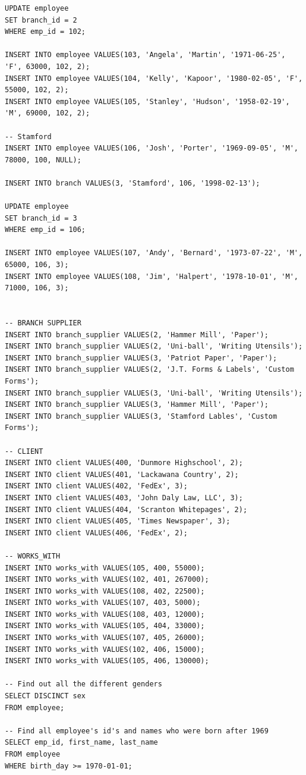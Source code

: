 \documentclass[8pt, a4paper, oneside, twocolumn]{extarticle}
\begin{document}
\begin{verbatim}
UPDATE employee
SET branch_id = 2
WHERE emp_id = 102;

INSERT INTO employee VALUES(103, 'Angela', 'Martin', '1971-06-25', 'F', 63000, 102, 2);
INSERT INTO employee VALUES(104, 'Kelly', 'Kapoor', '1980-02-05', 'F', 55000, 102, 2);
INSERT INTO employee VALUES(105, 'Stanley', 'Hudson', '1958-02-19', 'M', 69000, 102, 2);

-- Stamford
INSERT INTO employee VALUES(106, 'Josh', 'Porter', '1969-09-05', 'M', 78000, 100, NULL);

INSERT INTO branch VALUES(3, 'Stamford', 106, '1998-02-13');

UPDATE employee
SET branch_id = 3
WHERE emp_id = 106;

INSERT INTO employee VALUES(107, 'Andy', 'Bernard', '1973-07-22', 'M', 65000, 106, 3);
INSERT INTO employee VALUES(108, 'Jim', 'Halpert', '1978-10-01', 'M', 71000, 106, 3);


-- BRANCH SUPPLIER
INSERT INTO branch_supplier VALUES(2, 'Hammer Mill', 'Paper');
INSERT INTO branch_supplier VALUES(2, 'Uni-ball', 'Writing Utensils');
INSERT INTO branch_supplier VALUES(3, 'Patriot Paper', 'Paper');
INSERT INTO branch_supplier VALUES(2, 'J.T. Forms & Labels', 'Custom Forms');
INSERT INTO branch_supplier VALUES(3, 'Uni-ball', 'Writing Utensils');
INSERT INTO branch_supplier VALUES(3, 'Hammer Mill', 'Paper');
INSERT INTO branch_supplier VALUES(3, 'Stamford Lables', 'Custom Forms');

-- CLIENT
INSERT INTO client VALUES(400, 'Dunmore Highschool', 2);
INSERT INTO client VALUES(401, 'Lackawana Country', 2);
INSERT INTO client VALUES(402, 'FedEx', 3);
INSERT INTO client VALUES(403, 'John Daly Law, LLC', 3);
INSERT INTO client VALUES(404, 'Scranton Whitepages', 2);
INSERT INTO client VALUES(405, 'Times Newspaper', 3);
INSERT INTO client VALUES(406, 'FedEx', 2);

-- WORKS_WITH
INSERT INTO works_with VALUES(105, 400, 55000);
INSERT INTO works_with VALUES(102, 401, 267000);
INSERT INTO works_with VALUES(108, 402, 22500);
INSERT INTO works_with VALUES(107, 403, 5000);
INSERT INTO works_with VALUES(108, 403, 12000);
INSERT INTO works_with VALUES(105, 404, 33000);
INSERT INTO works_with VALUES(107, 405, 26000);
INSERT INTO works_with VALUES(102, 406, 15000);
INSERT INTO works_with VALUES(105, 406, 130000);

-- Find out all the different genders
SELECT DISCINCT sex
FROM employee;

-- Find all employee's id's and names who were born after 1969
SELECT emp_id, first_name, last_name
FROM employee
WHERE birth_day >= 1970-01-01;


\end{verbatim}
\end{document}

